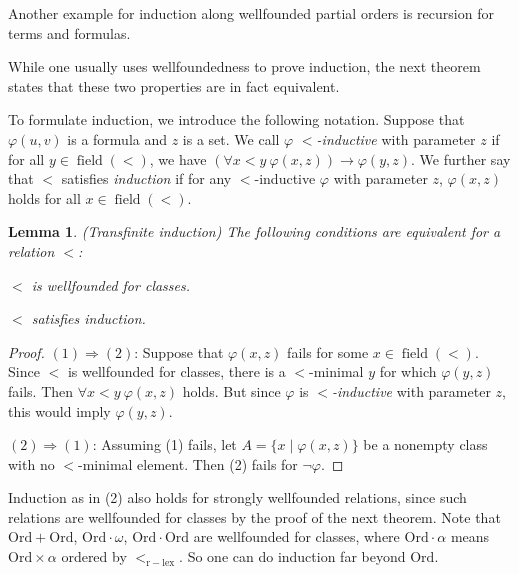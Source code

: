 \documentclass[a4paper, 11pt]{amsart}
\newtheorem{lemma}[lemma]{Lemma}
\theoremstyle{remark}
\newcommand{\Ord}{\mathrm{Ord}}
\newcommand{\pred}{\mathrm{pred}}
\DeclareMathOperator{\field}{field}
\newenvironment{enumerate-(1)}{\begin{enumerate}[label={\upshape (\arabic*)}, leftmargin=2pc]}{\end{enumerate}}
\begin{document}
Another example for induction along wellfounded partial orders is recursion for terms and formulas. 

While one usually uses wellfoundedness to prove induction, the next theorem states that these two properties are in fact equivalent. 

To formulate induction, we introduce the following notation. 
Suppose that $\varphi(u,v)$ is a formula and $z$ is a set. 
We call $\varphi$ \emph{$<$-inductive} with parameter $z$ if for all $y \in \field(<)$, we have $(\forall x<y\ \varphi(x,z)) \rightarrow \varphi(y,z)$. 
We further say that $<$ satisfies \emph{induction} if for any $<$-inductive $\varphi$ with parameter $z$, $\varphi(x,z)$ holds for all $x\in \field(<)$. 

\begin{lemma}(Transfinite induction) 
\label{transfinite induction} 
The following conditions are equivalent for a relation $<$: 
\begin{enumerate-(1)} 
\item 
$<$ is wellfounded for classes. 
\item 
$<$ satisfies induction. 
\end{enumerate-(1)} 
\end{lemma} 
\begin{proof} 
$(1)\Rightarrow (2)$: 
Suppose that $ \varphi(x,z)$ fails for some $x\in \field(<)$. 
Since $<$ is wellfounded for classes, there is a $<$-minimal $y$ for which $\varphi(y,z)$ fails. 
Then $\forall x<y\ \varphi(x,z)$ holds. 
But since $\varphi$ is \emph{$<$-inductive} with parameter $z$, this would imply $\varphi(y,z)$. 

$(2)\Rightarrow (1)$: 
Assuming (1) fails, let $A=\{x\mid \varphi(x,z)\}$ be a nonempty class with no $<$-minimal element. 
Then (2) fails for $\neg\varphi$. 
\end{proof} 

Induction as in (2) also holds for strongly wellfounded relations, since such relations are wellfounded for classes by the proof of the next theorem. 
Note that $\Ord+\Ord$, $\Ord\cdot \omega$, $\Ord\cdot \Ord$ are wellfounded for classes, where $\Ord \cdot \alpha$ means $\Ord \times \alpha$ ordered by $<_{\mathrm{r-lex}}$. 
So one can do induction far beyond $\Ord$. 
\end{document}
